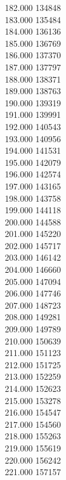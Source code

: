{ 182.000	134848 \\
 183.000	135484 \\
 184.000	136136 \\
 185.000	136769 \\
 186.000	137370 \\
 187.000	137797 \\
 188.000	138371 \\
 189.000	138763 \\
 190.000	139319 \\
 191.000	139991 \\
 192.000	140543 \\
 193.000	140956 \\
 194.000	141531 \\
 195.000	142079 \\
 196.000	142574 \\
 197.000	143165 \\
 198.000	143758 \\
 199.000	144118 \\
 200.000	144588 \\
 201.000	145220 \\
 202.000	145717 \\
 203.000	146142 \\
 204.000	146660 \\
 205.000	147094 \\
 206.000	147746 \\
 207.000	148723 \\
 208.000	149281 \\
 209.000	149789 \\
 210.000	150639 \\
 211.000	151123 \\
 212.000	151725 \\
 213.000	152259 \\
 214.000	152623 \\
 215.000	153278 \\
 216.000	154547 \\
 217.000	154560 \\
 218.000	155263 \\
 219.000	155619 \\
 220.000	156242 \\
 221.000	157157 \\
}
